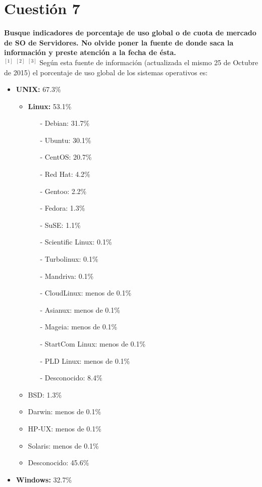 \documentclass[a4paper, 11pt]{article} %
\begin{document}
\section{Cuestión 7}
\textbf{Busque indicadores de porcentaje de uso global o de cuota de mercado de SO de Servidores. No olvide poner la fuente de donde saca la información y preste atención a la fecha de ésta.}\\
$^{[1]}$ $^{[2]}$ $^{[3]}$ Según esta fuente de información (actualizada el mismo 25 de Octubre de 2015) el porcentaje de uso global de los sistemas operativos es:
\begin{itemize}
\item \textbf{UNIX:} 67.3\%
	\begin{itemize}
	\item \textbf{Linux:} 53.1\%
	    \begin{itemize}
	    \item[-] Debian: 31.7\%
        \item[-] Ubuntu: 30.1\%
        \item[-] CentOS: 20.7\%
        \item[-] Red Hat: 4.2\%
        \item[-] Gentoo: 2.2\%
        \item[-] Fedora: 1.3\%
        \item[-] SuSE: 1.1\%
        \item[-] Scientific Linux: 0.1\%
        \item[-] Turbolinux: 0.1\%
        \item[-] Mandriva: 0.1\%
        \item[-] CloudLinux: menos de 0.1\%
        \item[-] Asianux: menos de 0.1\%
        \item[-] Mageia: menos de 0.1\%
        \item[-] StartCom Linux: menos de 0.1\%
        \item[-] PLD Linux: menos de 0.1\%
        \item[-] Desconocido: 8.4\%
	    \end{itemize}
	\item BSD: 1.3\%
	\item Darwin: menos de 0.1\%
	\item HP-UX: menos de 0.1\%
	\item Solaris: menos de 0.1\%
	\item Desconocido: 45.6\%
	\end{itemize}
\item \textbf{Windows:} 32.7\%
\end{itemize}
\end{document}
